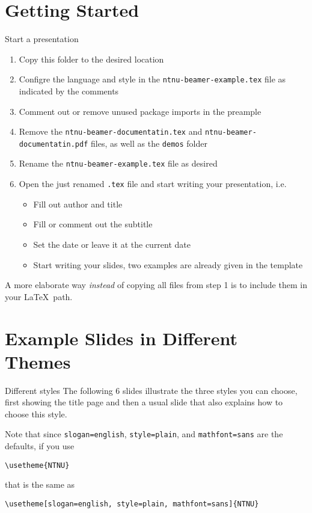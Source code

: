 \documentclass[aspectratio=169]{beamer}
\begin{document}
	\section{Getting Started}
		\begin{frame}[fragile]{Start a presentation}
			\label{slide:start}
			\begin{enumerate}
				\item Copy this folder to the desired location
				\item Configre the language and style in the \lstinline!ntnu-beamer-example.tex! file as indicated by the comments
				\item Comment out or remove unused package imports in the preample
				\item Remove the \lstinline!ntnu-beamer-documentatin.tex! and \lstinline!ntnu-beamer-documentatin.pdf! files, as well as the \lstinline!demos! folder
				\item Rename the \lstinline!ntnu-beamer-example.tex! file as desired
				\item Open the just renamed \lstinline!.tex! file and start writing your presentation, i.e.
				\begin{itemize}
					\item Fill out author and title
					\item Fill or comment out the subtitle
					\item Set the date or leave it at the current date
					\item Start writing your slides, two examples are already given in the template
				\end{itemize}
			\end{enumerate}

			A more elaborate way \emph{instead} of copying all files from step 1 is to
			include them in your \LaTeX\ path.
		\end{frame}


	\section{Example Slides in Different Themes}
	\begin{frame}[fragile]{Different styles}
		\label{slide:styles-demo}
		The following 6 slides illustrate the three styles you can choose,
		first showing the title page and then a usual slide that also explains how to choose this style.

		Note that since \lstinline!slogan=english!, \lstinline!style=plain!, and \lstinline!mathfont=sans! are the defaults, if you use

		\lstinline!\usetheme{NTNU}!

		that is the same as

		\lstinline!\usetheme[slogan=english, style=plain, mathfont=sans]{NTNU}!
	\end{frame}
\end{document}
